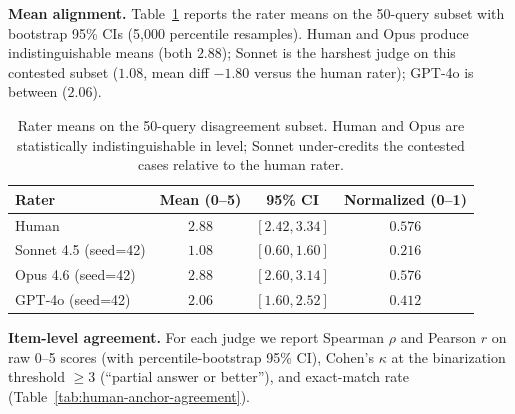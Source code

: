 \documentclass{article}
\begin{document}
\textbf{Mean alignment.} Table~\ref{tab:human-anchor-means} reports
the rater means on the 50-query subset with bootstrap 95\% CIs
(5{,}000 percentile resamples). Human and Opus produce
indistinguishable means (both $2.88$); Sonnet is the harshest judge
on this contested subset ($1.08$, mean diff $-1.80$ versus the human
rater); GPT-4o is between ($2.06$).

\begin{table}[h]
\centering
\small
\begin{tabular}{lccc}
\toprule
Rater & Mean (0--5) & 95\% CI & Normalized (0--1) \\
\midrule
Human                  & $2.88$ & $[2.42, 3.34]$ & $0.576$ \\
Sonnet 4.5 (seed=42)   & $1.08$ & $[0.60, 1.60]$ & $0.216$ \\
Opus 4.6 (seed=42)     & $2.88$ & $[2.60, 3.14]$ & $0.576$ \\
GPT-4o (seed=42)       & $2.06$ & $[1.60, 2.52]$ & $0.412$ \\
\bottomrule
\end{tabular}
\caption{Rater means on the 50-query disagreement subset.
Human and Opus are statistically indistinguishable in level; Sonnet
under-credits the contested cases relative to the human rater.}
\label{tab:human-anchor-means}
\end{table}

\textbf{Item-level agreement.} For each judge we report Spearman
$\rho$ and Pearson $r$ on raw 0--5 scores (with percentile-bootstrap
95\% CI), Cohen's $\kappa$ at the binarization threshold
$\geq 3$ (``partial answer or better''), and exact-match rate
(Table~\ref{tab:human-anchor-agreement}).
\end{document}
